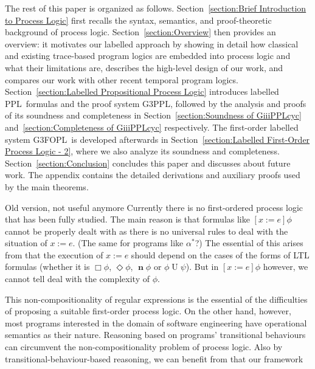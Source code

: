 \documentclass[manuscript,screen]{acmart}
\newcommand{\GiiiPPLcyc}[0]{\mbox{G3PPL}}
\newcommand{\GiiiFOPLcyc}[0]{\mbox{G3FOPL}}
\DeclareMathOperator{\nxt}{\mathbf{n}}
\DeclareMathOperator{\unt}{U}
\DeclareMathOperator{\ev}{\Diamond}
\newcommand{\PPL}[0]{\mbox{PPL}}
\begin{document}

The rest of this paper is organized as follows.  Section~\ref{section:Brief Introduction to Process Logic} first recalls the syntax, semantics, and proof-theoretic background of process logic.  
Section~\ref{section:Overview} then provides an overview: it motivates our labelled approach by showing in detail how classical and existing trace-based program logics are embedded into process logic and what their limitations are, describes the high-level design of our work, and compares our work with other recent temporal program logics. 
Section~\ref{section:Labelled Propositional Process Logic} introduces labelled \PPL\ formulas and the proof system \GiiiPPLcyc, followed by the analysis and proofs of its soundness and completeness in Section~\ref{section:Soundness of GiiiPPLcyc} and~\ref{section:Completeness of GiiiPPLcyc} respectively.  The first-order labelled system \GiiiFOPLcyc\ is developed afterwards in Section~\ref{section:Labelled First-Order Process Logic - 2}, where we also analyze its soundness and completeness.  
Section~\ref{section:Conclusion} concludes this paper and discusses about future work. 
The appendix contains the detailed derivations and auxiliary proofs used by the main theorems. 

\ifx Old version, not useful anymore
Currently there is no first-ordered process logic that has been fully studied. 
The main reason is that formulas like $[x:=e]\phi$ cannot be properly dealt with as there is no universal rules to deal with the situation of $x := e$. 
(The same for programs like $\alpha^*$?)   
The essential of this arises from that the execution of $x:=e$ should depend on the cases of the forms of LTL formulas (whether it is $\Box\phi$, $\ev \phi$, $\nxt\phi$ or $\phi\unt\psi$). But in $[x:=e]\phi$ however, we cannot tell deal with the complexity of $\phi$. 

This non-compositionality of regular expressions is the essential of the difficulties of proposing a suitable first-order process logic. 
On the other hand, however, most programs interested in the domain of software engineering have operational semantics as their nature. 
Reasoning based on programs' transitional behaviours can circumvent the non-compositionality problem of process logic. 
Also by transitional-behaviour-based reasoning, we can benefit from that our framework 
\end{document}

